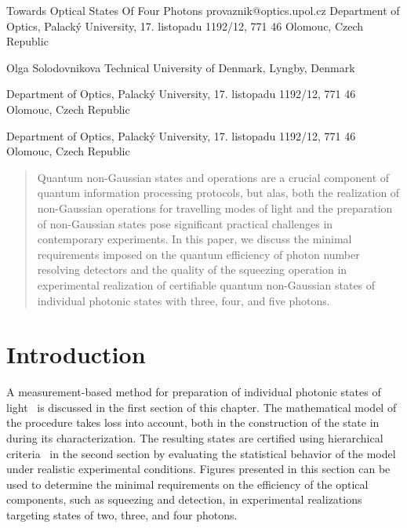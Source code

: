 \documentclass{article}
\begin{document}
\ArticleTitle
  {Towards Optical States Of Four Photons}
  {provaznik@optics.upol.cz}
\ArticleAuthorAddress
  {Department of Optics, Palack\'{y} University, 17. listopadu 1192/12, 771 46 Olomouc, Czech Republic}

\ArticleAuthor
  {Olga Solodovnikova}
\ArticleAuthorAddress
  {Technical University of Denmark, Lyngby, Denmark}

\ArticleAuthorAddress
  {Department of Optics, Palack\'{y} University, 17. listopadu 1192/12, 771 46 Olomouc, Czech Republic}

\ArticleAuthorAddress
  {Department of Optics, Palack\'{y} University, 17. listopadu 1192/12, 771 46 Olomouc, Czech Republic}

\ArticleTitlePrint

\begin{abstract}\noindent
  Quantum non-Gaussian states and operations are a crucial component of quantum information processing protocols, but alas, both the realization of non-Gaussian operations for travelling modes of light and the preparation of non-Gaussian states pose significant practical challenges in contemporary experiments. In this paper, we discuss the minimal requirements imposed on the quantum efficiency of photon number resolving detectors and the quality of the squeezing operation in experimental realization of certifiable quantum non-Gaussian states of individual photonic states with three, four, and five photons.
\end{abstract}

%
%

\section{Introduction}

A measurement-based method for preparation of individual photonic states of light~\cite{yukawa2013a,yoshikawa2018,tiedau2019,provaznik2020} is discussed in the first section of this chapter. The mathematical model of the procedure takes loss into account, both in the construction of the state in during its characterization. The resulting states are certified using hierarchical criteria~\cite{lachman2019} in the second section by evaluating the statistical behavior of the model under realistic experimental conditions. Figures presented in this section can be used to determine the minimal requirements on the efficiency of the optical components, such as squeezing and detection, in experimental realizations targeting states of two, three, and four photons.
\end{document}
